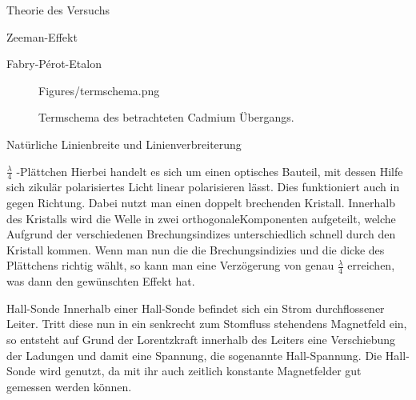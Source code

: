 \documentclass[pdftex, a4paper,11pt, twoside, ngerman]{report}
\begin{document}
\begin{chapter}{Theorie des Versuchs}
\begin{section}{Zeeman-Effekt}
\begin{subsection}{Fabry-Pérot-Etalon}
\begin{figure}[b!]
\begin{minipage}{0.48\textwidth}
                {Figures/termschema.png}
                \caption{Termschema des betrachteten Cadmium Übergangs.}
            \label{fig:termschema}
          \end{minipage}
        \end{figure}
      \end{subsection}
      
      
      
      \begin{subsection}{Natürliche Linienbreite und Linienverbreiterung}
        
        
      \end{subsection}
      
      
      
      \begin{subsection}{$\frac{\lambda}{4}$ -Plättchen}
        Hierbei handelt es sich um einen optisches Bauteil, mit dessen Hilfe
        sich zikulär polarisiertes Licht linear polarisieren lässt. Dies
        funktioniert auch in gegen Richtung. Dabei nutzt man einen doppelt
        brechenden Kristall. Innerhalb des Kristalls wird die Welle in zwei
        orthogonaleKomponenten aufgeteilt, welche Aufgrund der verschiedenen
        Brechungsindizes unterschiedlich schnell durch den Kristall kommen.
        Wenn man nun die die Brechungsindizies und die dicke des Plättchens
        richtig wählt, so kann man eine Verzögerung von genau $\frac \lambda 4$
        erreichen, was dann den gewünschten Effekt hat.
        
      \end{subsection}
      
      
      
      \begin{subsection}{Hall-Sonde}
        Innerhalb einer Hall-Sonde befindet sich ein Strom durchflossener
        Leiter. Tritt diese nun in ein senkrecht zum Stomfluss stehendens
        Magnetfeld ein, so entsteht auf Grund der Lorentzkraft innerhalb des
        Leiters eine Verschiebung der Ladungen und damit eine Spannung, die
        sogenannte Hall-Spannung. Die Hall-Sonde wird genutzt, da mit ihr auch
        zeitlich konstante Magnetfelder gut gemessen werden können.
        

\end{subsection}
\end{section}
\end{chapter}
\end{document}
